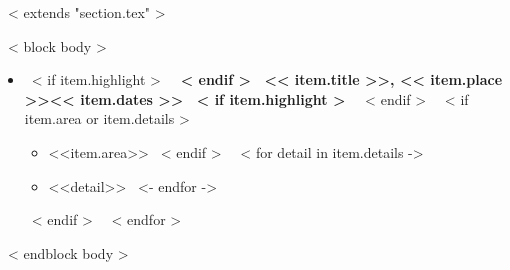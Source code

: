 ~< extends "section.tex" >~

~< block body >~
  \begin{itemize}
    ~< for item in items >~
      \item{
        ~< if item.highlight >~
        \textbf{
        ~< endif >~
        << item.title >>, << item.place >>\hfill << item.dates >>
        ~< if item.highlight >~
        }
        ~< endif >~
      }
      ~< if item.area or item.details >~
      \begin{itemize}
        ~< if item.area >~
          \item <<item.area>>
        ~< endif >~
        ~< for detail in item.details ->~
          \item <<detail>>
        ~<- endfor ->~
      \end{itemize}
      ~< endif >~
    ~< endfor >~
  \end{itemize}
~< endblock body >~
